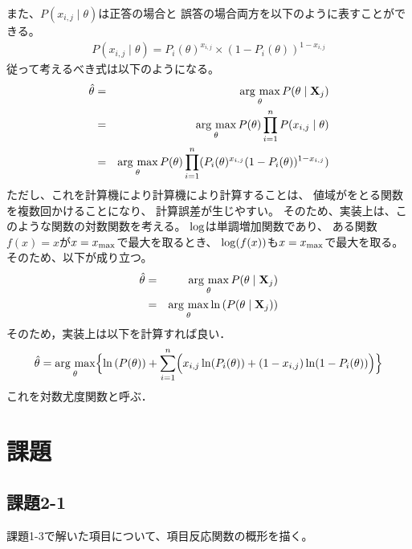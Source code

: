 \documentclass[12pt]{jarticle}
\begin{document}
また、$P(x_{i,j}\mid \theta)$は正答の場合と
誤答の場合両方を以下のように表すことができる。
\begin{eqnarray}
    P(x_{i,j}\mid \theta)=P_i(\theta)^{x_{i,j}}\times (1-P_i(\theta))^{1-x_{i,j}}
\end{eqnarray}
従って考えるべき式は以下のようになる。
\begin{eqnarray}
    \hat{\theta}&=& \mathop{\rm arg~max}\limits_{\theta} P(\theta \mid {\bf X}_j)\\
    &=& \mathop{\rm arg~max}\limits_{\theta} P(\theta)\prod_{i=1}^n P(x_{i,j} \mid \theta)\\
    &=& \mathop{\rm arg~max}\limits_{\theta} P(\theta)\prod_{i=1}^n (P_i(\theta)^{x_{i,j}}(1-P_i(\theta))^{1-x_{i,j}})
\end{eqnarray}
ただし、これを計算機により計算機により計算することは、
値域がをとる関数を複数回かけることになり、
計算誤差が生じやすい。
そのため、実装上は、このような関数の対数関数を考える。
${\rm log}$は単調増加関数であり、
ある関数$f(x)=x$が$x=x_{\rm max}$で最大を取るとき、
${\rm log}(f(x))$も$x=x_{\rm max}$で最大を取る。
そのため、以下が成り立つ。
\begin{eqnarray}
    \hat{\theta}&=& \mathop{\rm arg~max}\limits_{\theta} P(\theta \mid {\bf X}_j)\\
    &=& \mathop{\rm arg~max}\limits_{\theta} \ln{(P(\theta \mid {\bf X}_j))}
\end{eqnarray}
そのため，実装上は以下を計算すれば良い．
\begin{eqnarray}
    \hat{\theta}=\mathop{\rm arg~max}\limits_{\theta} \Bigl\{\ln{(P(\theta))+\sum_{i=1}^n \Bigl(x_{i,j}\ln(P_i(\theta))+(1-x_{i,j})\ln(1-P_i(\theta))\Bigr)}\Bigr\}
\end{eqnarray}
これを対数尤度関数と呼ぶ．

\clearpage
\section{課題}
\subsection{課題2-1}
\begin{shadebox}
    課題1-3で解いた項目について、項目反応関数の概形を描く。
\end{shadebox}
\end{document}
